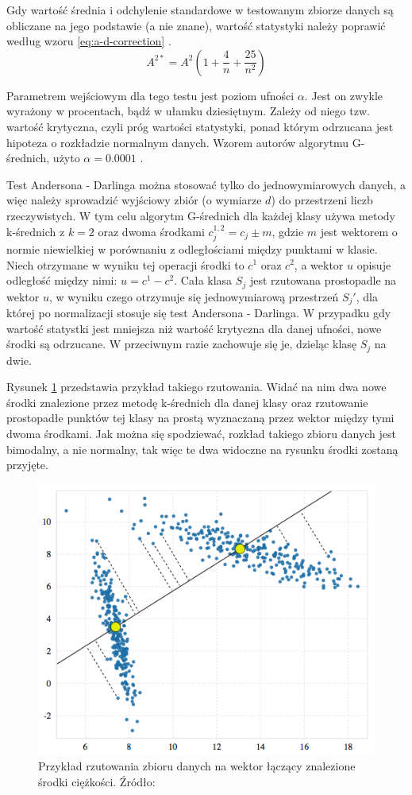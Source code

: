 Gdy wartość średnia i odchylenie standardowe w testowanym zbiorze danych są obliczane na jego podstawie (a nie znane), wartość statystyki należy poprawić według wzoru \ref{eq:a-d-correction} \cite{GMeans}.
\begin{equation}
\label{eq:a-d-correction}
	A^{2*} = A^{2}(1 + \frac{4}{n} + \frac{25}{n^{2}})
\end{equation}

Parametrem wejściowym dla tego testu jest poziom ufności $\alpha$. Jest on zwykle wyrażony w procentach, bądź w ułamku dziesiętnym. Zależy od niego tzw. wartość krytyczna, czyli próg wartości statystyki, ponad którym odrzucana jest hipoteza o rozkładzie normalnym danych. Wzorem autorów algorytmu G-średnich, użyto $\alpha=0.0001$ \cite{GMeans}.

Test Andersona - Darlinga można stosować tylko do jednowymiarowych danych, a więc należy sprowadzić wyjściowy zbiór (o wymiarze $d$) do przestrzeni liczb rzeczywistych. W tym celu algorytm G-średnich dla każdej klasy używa metody k-średnich z $k=2$ oraz dwoma środkami $c^{1,2}_j = c_j \pm m$, gdzie $m$ jest wektorem o normie niewielkiej w porównaniu z odległościami między punktami w klasie. Niech otrzymane w wyniku tej operacji środki to $c^1$ oraz $c^2$, a wektor $u$ opisuje odległość między nimi: $u = c^1 - c^2$. Cała klasa $S_j$ jest rzutowana prostopadle na wektor $u$, w wyniku czego otrzymuje się jednowymiarową przestrzeń $S_j '$, dla której po normalizacji stosuje się test Andersona - Darlinga. W przypadku gdy wartość statystki jest mniejsza niż wartość krytyczna dla danej ufności, nowe środki są odrzucane. W przeciwnym razie zachowuje się je, dzieląc klasę $S_j$ na dwie.

Rysunek \ref{fig:g-means-projection} przedstawia przykład takiego rzutowania. Widać na nim dwa nowe środki znalezione przez metodę k-średnich dla danej klasy oraz rzutowanie prostopadłe punktów tej klasy na prostą wyznaczaną przez wektor między tymi dwoma środkami. Jak można się spodziewać, rozkład takiego zbioru danych jest bimodalny, a nie normalny, tak więc te dwa widoczne na rysunku środki zostaną przyjęte.

\begin{figure}
\centering
\includegraphics[width=0.7\linewidth]{Grafika/g-means-projection}
\caption{Przykład rzutowania zbioru danych na wektor łączący znalezione środki ciężkości. Źródło: \cite{GMeansExplanation}}
\label{fig:g-means-projection}
\end{figure}

